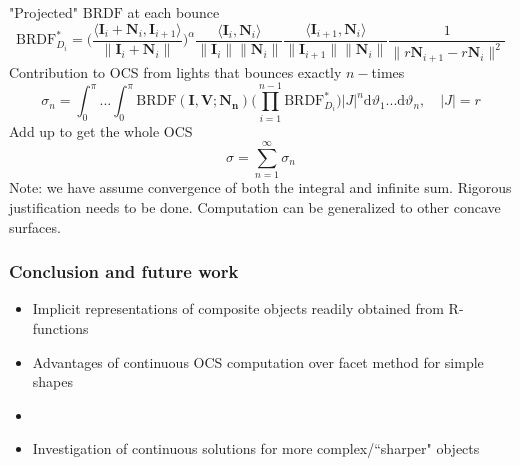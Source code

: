 \documentclass{beamer}
\newcommand{\BRDF}{\mathrm{BRDF}}
\newcommand{\ip}[2]{\langle {#1}, {#2} \rangle}
\begin{document}
\begin{frame}[t]
"Projected" $\BRDF$ at each bounce
$$\BRDF^*_{D_i}=\Bigg(\frac{\ip{\mathbf{I}_i+\mathbf{N}_i}{\mathbf{I}_{i+1}}}{\|\mathbf{I}_i+\mathbf{N}_i\|}\Bigg)^\alpha\frac{\ip{\mathbf{I}_i}{\mathbf{N}_i}}{\|\mathbf{I}_i\|\|\mathbf{N}_i\|}\frac{\ip{\mathbf{I}_{i+1}}{\mathbf{N}_i}}{\|\mathbf{I}_{i+1}\|\|\mathbf{N}_i\|} \frac{1}{\|r\mathbf{N}_{i+1}-r\mathbf{N}_i\|^2}$$
Contribution to OCS from lights that bounces exactly $n-$times 
\begin{equation*}
\sigma_n =\int_{0}^{\pi}...\int_{0}^{\pi}\BRDF(\mathbf{I},\mathbf{V};\mathbf{N_n})\bigg(\prod_{i=1}^{n-1}\BRDF^*_{D_i}\bigg) |J|^n\mathrm{d}\vartheta_1...\mathrm{d}\vartheta_n , \quad |J|=r
\end{equation*}
Add up to get the whole OCS
$$\sigma=\sum_{n=1}^{\infty} \sigma_n$$
Note: we have assume convergence of both the integral and infinite sum. Rigorous justification needs to be done. Computation can be generalized to other concave surfaces. 
\end{frame}

\begin{frame}[t]
\frametitle{Conclusion and future work}
\begin{itemize}
\item Implicit representations of composite objects readily obtained from R-functions 
\item Advantages of continuous OCS computation over facet method for simple shapes
\item 
\item Investigation of continuous solutions for more complex/``sharper" objects 
\end{itemize}
\end{frame}
\end{document}
